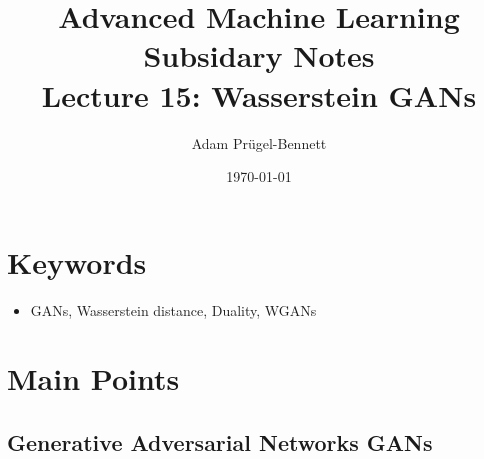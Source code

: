 \documentclass[11pt]{article}
\author{Adam Prügel-Bennett}
\date{\today}
\title{Advanced Machine Learning Subsidary Notes\\\medskip
\large Lecture 15: Wasserstein GANs}
\begin{document}
\maketitle

\section{Keywords}
\label{sec:org9ada448}
\begin{itemize}
\item GANs, Wasserstein distance, Duality, WGANs
\end{itemize}

\section{Main Points}
\label{sec:org1bbd209}
\subsection{Generative Adversarial Networks GANs}
\label{sec:orgb6fb8c4}
\end{document}
